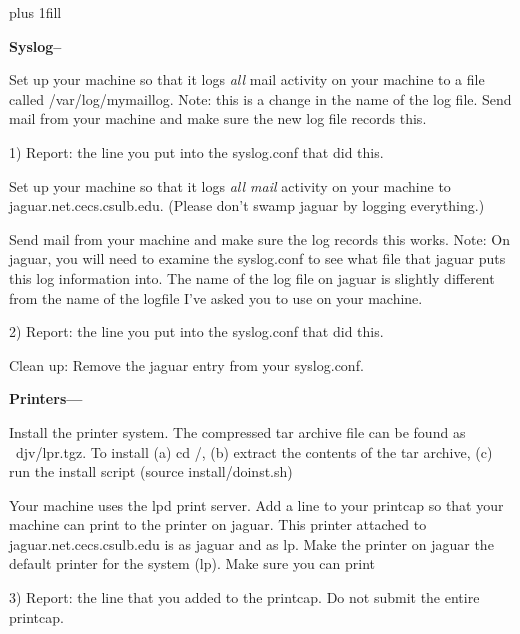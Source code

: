 
\rightskip=0pt plus 1fill

\parindent 0pt

{\bf Syslog--}

Set up your machine so that it logs {\it  all} mail activity 
on your machine to a file called {\ltt{}/var/log/mymaillog}.
Note: this is a change in the name of the log file.
Send mail from your machine and make sure the new log file records this.

1) Report: the line you put into the syslog.conf that did this.

Set up your machine so that it logs {\it all mail} activity 
on your machine to 
{\ltt{}jaguar.net.cecs.csulb.edu}.
(Please don't swamp jaguar by logging everything.)

Send mail from your machine and make sure the log records this works.
Note: On {\ltt{}jaguar}, you will need to examine the {\ltt{}syslog.conf}
to see what file that {\ltt{}jaguar} puts this log information into.
The name of the log file on jaguar is slightly different from
the name of the logfile I've asked you to use on your machine.

2) Report: the line you put into the syslog.conf that did this.

Clean up: Remove the {\ltt{}jaguar} entry from your {\ltt{}syslog.conf}.

{\bf Printers---}

Install the printer system. The compressed tar archive file can
be found as {\ltt{}~djv/lpr.tgz}.
To install (a) {\ltt{}cd /}, (b) extract the contents of the tar archive,
(c) run the install script ({\ltt{}source install/doinst.sh})


Your machine uses the lpd print server.
Add a line to your printcap so that your machine can
print to the printer on jaguar.
This printer attached to {\ltt{}jaguar.net.cecs.csulb.edu} is
as {\ltt{}jaguar} and as {\ltt{}lp}.
Make the printer on {\ltt{}jaguar} the default printer for the system 
({\ltt{}lp}).
Make sure you can print

3) Report: the line that you added to the printcap. 
Do not submit the entire printcap.



\bye
